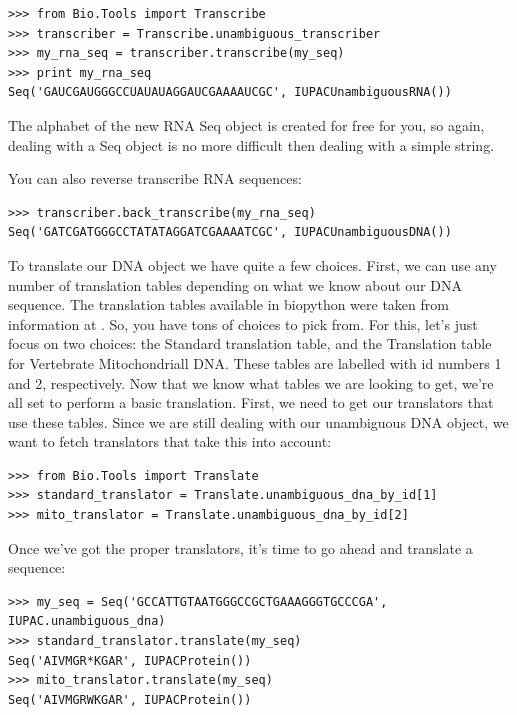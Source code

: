 \documentclass{report}
\begin{document}
\begin{verbatim}
>>> from Bio.Tools import Transcribe
>>> transcriber = Transcribe.unambiguous_transcriber
>>> my_rna_seq = transcriber.transcribe(my_seq)
>>> print my_rna_seq
Seq('GAUCGAUGGGCCUAUAUAGGAUCGAAAAUCGC', IUPACUnambiguousRNA())
\end{verbatim}

The alphabet of the new RNA Seq object is created for free for you, so again, dealing with a Seq object is no more difficult then dealing with a simple string.


You can also reverse transcribe RNA sequences:

\begin{verbatim}
>>> transcriber.back_transcribe(my_rna_seq)
Seq('GATCGATGGGCCTATATAGGATCGAAAATCGC', IUPACUnambiguousDNA())
\end{verbatim}


To translate our DNA object we have quite a few choices. First, we can use any number of translation tables depending on what we know about our DNA sequence. The translation tables available in biopython were taken from information at . So, you have tons of choices to pick from. For this, let's just focus on two choices: the Standard translation table, and the Translation table for Vertebrate Mitochondriall DNA. These tables are labelled with id numbers 1 and 2, respectively. Now that we know what tables we are looking to get, we're all set to perform a basic translation. First, we need to get our translators that use these tables. Since we are still dealing with our unambiguous DNA object, we want to fetch translators that take this into account:

\begin{verbatim}
>>> from Bio.Tools import Translate
>>> standard_translator = Translate.unambiguous_dna_by_id[1] 
>>> mito_translator = Translate.unambiguous_dna_by_id[2]
\end{verbatim}

Once we've got the proper translators, it's time to go ahead and translate a sequence:

\begin{verbatim}
>>> my_seq = Seq('GCCATTGTAATGGGCCGCTGAAAGGGTGCCCGA', IUPAC.unambiguous_dna)
>>> standard_translator.translate(my_seq)
Seq('AIVMGR*KGAR', IUPACProtein())
>>> mito_translator.translate(my_seq)
Seq('AIVMGRWKGAR', IUPACProtein())
\end{verbatim}
\end{document}
